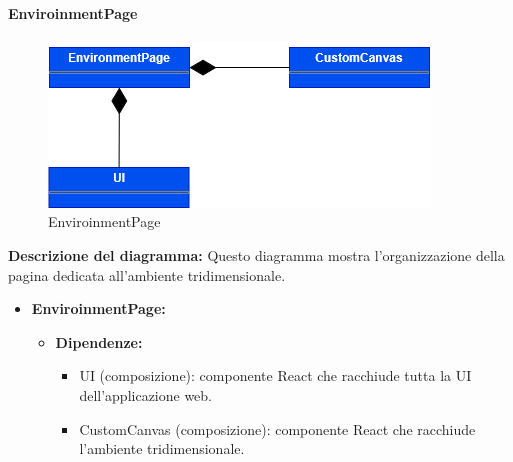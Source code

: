 \paragraph{EnviroinmentPage}
\begin{figure}[h!] \centering
    \includegraphics[scale=0.45]{template/images/uml_front/ui/envpage.png}
    \caption{EnviroinmentPage}
\end{figure}
\textbf{Descrizione del diagramma:}
Questo diagramma mostra l'organizzazione della pagina dedicata all'ambiente tridimensionale.
\begin{itemize}
    \item \textbf{EnviroinmentPage:}
    \begin{itemize}
        \item \textbf{Dipendenze:}
        \begin{itemize}
            \item UI (composizione): componente React che racchiude tutta la UI dell'applicazione web.
            \item CustomCanvas (composizione): componente React che racchiude l'ambiente tridimensionale.
        \end{itemize} 
    \end{itemize}
\end{itemize}

